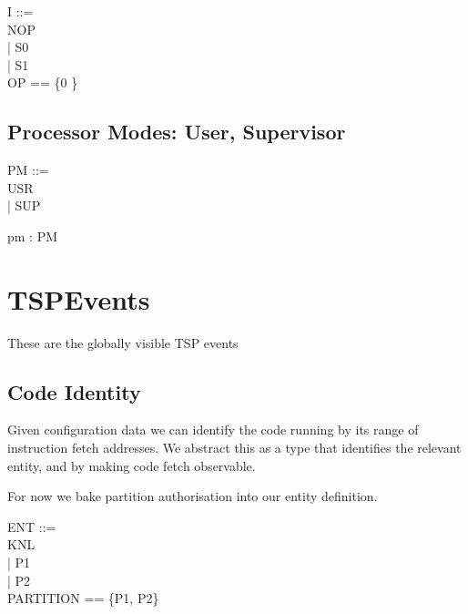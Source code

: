 \begin{circus}
I ::=\\
  NOP\\   %
  | S0\\    %
  | S1\\    %

OP == \{0 \}
\end{circus}

\subsection{Processor Modes: User, Supervisor}

\begin{circus}
PM ::=\\
 USR\\
 | SUP
\end{circus}

\begin{circus}
\circchannel pm : PM
\end{circus}


\section{TSPEvents}

These are the globally visible TSP events

\subsection{Code Identity}%

Given configuration data we can identify the code running
by its range of instruction fetch addresses.
We abstract this as a type that identifies the relevant entity,
and by making code fetch observable.

For now we bake partition authorisation into our entity definition.

\begin{circus}
ENT ::=\\
  KNL\\  %
 | P1\\   %
 | P2\\   %
PARTITION == \{P1, P2\}
\end{circus}

